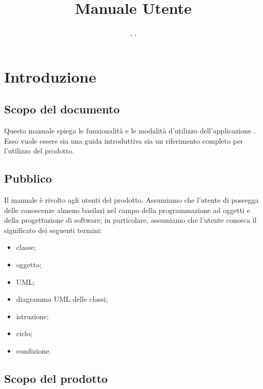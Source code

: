 


\author{\LB, \GG, \AZ}
\supervisor{\PB}
\title{Manuale Utente}


\maketitle

\tableofcontents






\section{Introduzione}

\subsection{Scopo del documento}
Questo manuale spiega le funzionalità e le modalità d'utilizzo dell'applicazione \proj. Esso vuole essere sia una guida introduttiva sia un riferimento completo per l'utilizzo del prodotto.

\subsection{Pubblico}
Il manuale è rivolto agli utenti del prodotto. Assumiamo che l'utente di \proj{} possegga delle conoscenze almeno basilari nel campo della programmazione ad oggetti e della progettazione di software; in particolare, assumiamo che l'utente conosca il significato dei seguenti termini:
\begin{itemize}
	\item classe;
	\item oggetto;
	\item UML;
	\item diagramma UML delle classi;
	\item istruzione;
	\item ciclo;
	\item condizione.
\end{itemize}

\subsection{Scopo del prodotto}
\scopo

